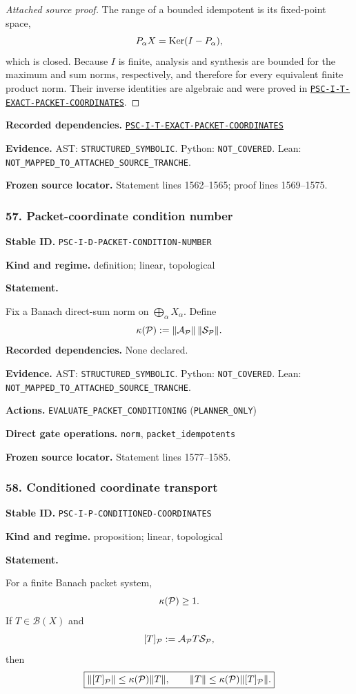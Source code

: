 \documentclass[a4paper,11pt]{article}
\newcommand{\field}[2]{\noindent\textbf{#1.} #2\par}
\begin{document}
\begin{proof}[Attached source proof]
The range of a bounded idempotent is its fixed-point space,
\[
P_\alpha X=\operatorname{Ker}(I-P_\alpha),
\]
which is closed.  Because $I$ is finite, analysis and synthesis are bounded for the maximum and sum norms, respectively, and therefore for every equivalent finite product norm.  Their inverse identities are algebraic and were proved in \hyperref[rec:PSC-I-T-EXACT-PACKET-COORDINATES]{\nolinkurl{PSC-I-T-EXACT-PACKET-COORDINATES}}.
\end{proof}
\field{Recorded dependencies}{\hyperref[rec:PSC-I-T-EXACT-PACKET-COORDINATES]{\nolinkurl{PSC-I-T-EXACT-PACKET-COORDINATES}}}
\field{Evidence}{AST: \nolinkurl{STRUCTURED_SYMBOLIC}. Python: \nolinkurl{NOT_COVERED}. Lean: \nolinkurl{NOT_MAPPED_TO_ATTACHED_SOURCE_TRANCHE}.}
\field{Frozen source locator}{Statement lines 1562--1565; proof lines 1569--1575.}
\subsubsection*{57. Packet-coordinate condition number}
\label{rec:PSC-I-D-PACKET-CONDITION-NUMBER}
\field{Stable ID}{\nolinkurl{PSC-I-D-PACKET-CONDITION-NUMBER}}
\field{Kind and regime}{definition; linear, topological}
\textbf{Statement.}\par
Fix a Banach direct-sum norm on $\bigoplus_\alpha X_\alpha$.  Define
\[
\kappa(\mathcal P):=
\|\mathcal A_{\mathcal P}\|\,
\|\mathcal S_{\mathcal P}\|.
\]
\field{Recorded dependencies}{None declared.}
\field{Evidence}{AST: \nolinkurl{STRUCTURED_SYMBOLIC}. Python: \nolinkurl{NOT_COVERED}. Lean: \nolinkurl{NOT_MAPPED_TO_ATTACHED_SOURCE_TRANCHE}.}
\field{Actions}{\nolinkurl{EVALUATE_PACKET_CONDITIONING} (\nolinkurl{PLANNER_ONLY})}
\field{Direct gate operations}{\nolinkurl{norm}, \nolinkurl{packet_idempotents}}
\field{Frozen source locator}{Statement lines 1577--1585.}
\subsubsection*{58. Conditioned coordinate transport}
\label{rec:PSC-I-P-CONDITIONED-COORDINATES}
\field{Stable ID}{\nolinkurl{PSC-I-P-CONDITIONED-COORDINATES}}
\field{Kind and regime}{proposition; linear, topological}
\textbf{Statement.}\par
For a finite Banach packet system,
\[
\kappa(\mathcal P)\geq1.
\]
If $T\in\mathcal B(X)$ and
\[
[T]_{\mathcal P}:=\mathcal A_{\mathcal P}T\mathcal S_{\mathcal P},
\]
then
\[
\boxed{
\|[T]_{\mathcal P}\|
\leq\kappa(\mathcal P)\|T\|,
\qquad
\|T\|
\leq\kappa(\mathcal P)\|[T]_{\mathcal P}\|.
}
\]
\end{document}
